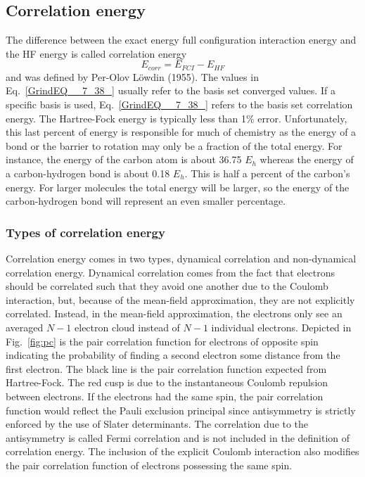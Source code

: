 \documentclass[11pt,oneside,final]{huthesis}%
\begin{document}
\subsection{Correlation energy}\label{ssec:corr}

The difference between the exact energy full configuration interaction energy and the HF energy is called correlation energy
\begin{equation}
   E_{corr}= E_{FCI}-E_{HF}
\label{GrindEQ__7_38_}
\end{equation}
and was defined by Per-Olov L{\"o}wdin (1955).  The values in Eq.~\eqref{GrindEQ__7_38_} usually refer to the basis set converged values.  If a specific basis is used, Eq.~\eqref{GrindEQ__7_38_} refers to the basis set correlation energy. The Hartree-Fock energy is typically less than 1\% error.  Unfortunately, this last percent of energy is responsible for much of chemistry as the energy of a bond or the barrier to rotation may only be a fraction of the total energy. For instance, the energy of the carbon atom is about 36.75 ${E}_{h}$ whereas the energy of a carbon-hydrogen bond is about 0.18 ${E}_{h}$. This is half a percent of the carbon's energy.  For larger molecules the total energy will be larger, so the energy of the carbon-hydrogen bond will represent an even smaller  percentage.

\subsubsection{Types of correlation energy}

Correlation energy comes in two types, {dynamical correlation} and {non-dynamical correlation} energy.  Dynamical correlation comes from the fact that electrons should be correlated such that they avoid one another due to the Coulomb interaction, but, because of the mean-field approximation, they are not explicitly correlated. Instead, in the mean-field approximation, the electrons only see an averaged $N-1$ electron cloud instead of $N-1$ individual electrons. Depicted in Fig.~\ref{fig:pc} is the pair correlation function for electrons of opposite spin indicating the probability of finding a second electron some distance from the first electron.  The black line is the pair correlation function expected from Hartree-Fock.  The red cusp is due to the instantaneous Coulomb repulsion between electrons.  If the electrons had the same spin, the pair correlation function would reflect the Pauli exclusion principal since antisymmetry is strictly enforced by the use of Slater determinants.  The correlation due to the antisymmetry is called {Fermi correlation} and is not included in the definition of correlation energy.  The inclusion of the explicit Coulomb interaction also modifies the pair correlation function of electrons possessing the same spin.
\end{document}
